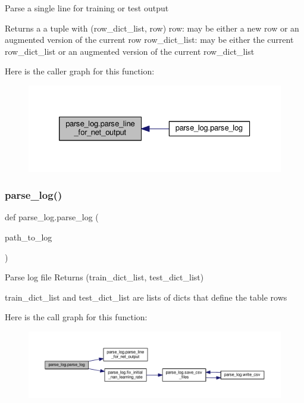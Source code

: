 \begin{DoxyVerb}Parse a single line for training or test output

Returns a a tuple with (row_dict_list, row)
row: may be either a new row or an augmented version of the current row
row_dict_list: may be either the current row_dict_list or an augmented
version of the current row_dict_list
\end{DoxyVerb}
 Here is the caller graph for this function\+:
\nopagebreak
\begin{figure}[H]
\begin{center}
\leavevmode
\includegraphics[width=326pt]{namespaceparse__log_a140116e322b21ebd36d194b65a5612fb_icgraph}
\end{center}
\end{figure}
\mbox{\label{namespaceparse__log_ac340d5a4faf6c29869b3702916e3f237}} 
\subsubsection{\texorpdfstring{parse\+\_\+log()}{parse\_log()}}
{\footnotesize\ttfamily def parse\+\_\+log.\+parse\+\_\+log (\begin{DoxyParamCaption}\item[{}]{path\+\_\+to\+\_\+log }\end{DoxyParamCaption})}

\begin{DoxyVerb}Parse log file
Returns (train_dict_list, test_dict_list)

train_dict_list and test_dict_list are lists of dicts that define the table
rows
\end{DoxyVerb}
 Here is the call graph for this function\+:
\nopagebreak
\begin{figure}[H]
\begin{center}
\leavevmode
\includegraphics[width=350pt]{namespaceparse__log_ac340d5a4faf6c29869b3702916e3f237_cgraph}
\end{center}
\end{figure}
\mbox{\label{namespaceparse__log_a6541ec62fedcd2928543ff22ec4401b3}} 
